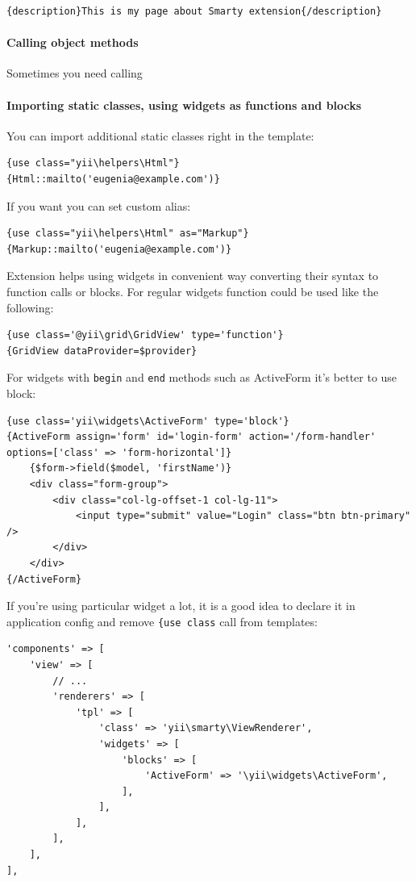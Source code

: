 \begin{lstlisting}
{description}This is my page about Smarty extension{/description}
\end{lstlisting}
\paragraph{Calling object methods}
Sometimes you need calling

\paragraph{Importing static classes, using widgets as functions and blocks}
You can import additional static classes right in the template:

\begin{lstlisting}
{use class="yii\helpers\Html"}
{Html::mailto('eugenia@example.com')}
\end{lstlisting}
If you want you can set custom alias:

\begin{lstlisting}
{use class="yii\helpers\Html" as="Markup"}
{Markup::mailto('eugenia@example.com')}
\end{lstlisting}
Extension helps using widgets in convenient way converting their syntax to function calls or blocks. For regular widgets
function could be used like the following:

\begin{lstlisting}
{use class='@yii\grid\GridView' type='function'}
{GridView dataProvider=$provider}
\end{lstlisting}
For widgets with \lstinline|begin| and \lstinline|end| methods such as ActiveForm it's better to use block:

\begin{lstlisting}
{use class='yii\widgets\ActiveForm' type='block'}
{ActiveForm assign='form' id='login-form' action='/form-handler' options=['class' => 'form-horizontal']}
    {$form->field($model, 'firstName')}
    <div class="form-group">
        <div class="col-lg-offset-1 col-lg-11">
            <input type="submit" value="Login" class="btn btn-primary" />
        </div>
    </div>
{/ActiveForm}
\end{lstlisting}
If you're using particular widget a lot, it is a good idea to declare it in application config and remove \lstinline|{use class|
call from templates:

\lstset{language=php}\begin{lstlisting}
'components' => [
    'view' => [
        // ...
        'renderers' => [
            'tpl' => [
                'class' => 'yii\smarty\ViewRenderer',
                'widgets' => [
                    'blocks' => [
                        'ActiveForm' => '\yii\widgets\ActiveForm',
                    ],
                ],
            ],
        ],
    ],
],
\end{lstlisting}
